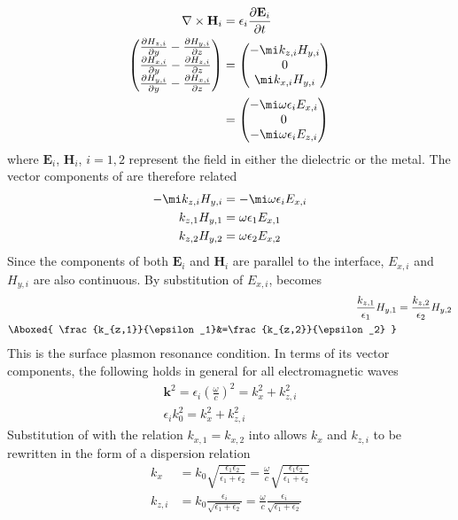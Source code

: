 \begin{align}
\nabla \times \mathbf{H}_i &= \epsilon_i \frac{\partial \mathbf{E}_i}{\partial t}\\
\begin{pmatrix}
\frac{\partial H_{z,i}}{\partial y} - \frac{\partial H_{y,i}}{\partial z}\\
\frac{\partial H_{x,i}}{\partial y} - \frac{\partial H_{z,i}}{\partial z}\\
\frac{\partial H_{y,i}}{\partial y} - \frac{\partial H_{x,i}}{\partial z}
\end{pmatrix}
&= \begin{pmatrix}
-\mi k_{z,i} H_{y,i}\\
0\\
\mi k_{x,i} H_{y,i}
\end{pmatrix}
\\
&= \begin{pmatrix}
-\mi \omega \epsilon_i E_{x,i}\\
0\\
-\mi \omega \epsilon_i E_{z,i}
\end{pmatrix}
\label{eqn:vectordisp}
\end{align}
where $\mathbf{E}_i$, $\mathbf{H}_i$, $i=1,2$ represent the field in either the
dielectric or the metal.  The vector components of
 are therefore related 
\begin{align}
-\mi k_{z,i} H_{y,i} &= -\mi \omega \epsilon_i E_{x,i}\\
k_{z,1} H_{y,1} &= \omega \epsilon_1 E_{x,1}\\
k_{z,2} H_{y,2} &= \omega \epsilon_2 E_{x,2}
\label{eqn:spderivsteptwo}
\end{align}
Since the components of both $\mathbf{E}_i$ and $\mathbf{H}_i$ are
parallel to the interface, $E_{x,i}$ and $H_{y,i}$ are also
continuous. By substitution of $E_{x,i}$,  becomes
\begin{align}
\frac{k_{z,1}}{\epsilon_1}H_{y,1}&=\frac{k_{z,2}}{\epsilon_2}H_{y,2}\\ 
\Aboxed{
\frac{k_{z,1}}{\epsilon_1}&=\frac{k_{z,2}}{\epsilon_2} 
}
\label{eqn:sprcondition}
\end{align}
This is the surface plasmon resonance condition.  In terms of
its vector components, the following holds in general for all electromagnetic
waves
\begin{align}
\mathbf{k}^2=\epsilon_i \left(\frac{\omega}{c}\right)^2=k_x^2 + k_{z,i}^2\\
\epsilon_i k_0^2=k_x^2 + k_{z,i}^2
\label{eqn:dispersion1}
\end{align}
Substitution of  with the relation 
$k_{x,1}=k_{x,2}$ into  allows 
$k_x$ and $k_{z,i}$ to be rewritten in the form of a dispersion relation
\begin{align}
k_x &= k_0\sqrt{\frac{\epsilon_1 \epsilon_2}{\epsilon_1+\epsilon_2}} 
= \frac{\omega}{c}\sqrt{\frac{\epsilon_1 \epsilon_2}{\epsilon_1+\epsilon_2}}\\
k_{z,i} &= k_0\frac{\epsilon_i}{\sqrt{\epsilon_1+\epsilon_2}}
= \frac{\omega}{c}\frac{\epsilon_i}{\sqrt{\epsilon_1+\epsilon_2}}
\end{align}


